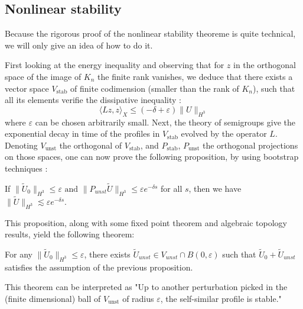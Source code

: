 \documentclass[11pt,a4paper]{article}
\begin{document}
\subsection{Nonlinear stability}
Because the rigorous proof of the nonlinear stability theoreme is quite technical, we will only give an idea of how to do it.

First looking at the energy inequality and observing that for $z$ in the orthogonal space of the image of $K_n$ the finite rank vanishes, we deduce that there exists a vector space $V_{\text{stab}}$ of finite codimension (smaller than the rank of $K_n$), such that all its elements verifie the dissipative inequality : \[\langle  L z, z \rangle_X \leq (-\delta+\varepsilon) \| U \|_{H^3}\]
where $\varepsilon$ can be chosen arbitrarily small.
Next, the theory of semigroups give the exponential decay in time of the profiles in $V_{\text{stab}}$ evolved by the operator $L$.  Denoting $V_{\text{unst}}$ the orthogonal of $V_{\text{stab}}$, and $P_{\text{stab}}$, $P_{\text{unst}}$ the orthogonal projections on those spaces, one can now prove the following proposition, by using bootstrap techniques :
\begin{prop}
If $\|\tilde U_0 \|_{H^3} \leq \varepsilon \text{ and } \|P_{unst}\tilde U \|_{H^3} \leq \varepsilon e^{-\delta s}$ for all $s$, then we have $\|\tilde U \|_{H^3} \lesssim  \varepsilon e^{-\delta s}$.
\end{prop}
This proposition, along with some fixed point theorem and algebraic topology results, yield the following theorem:

\begin{thm}\label{unstab}
For any $\|\tilde U_0 \|_{H^3} \leq \varepsilon$, there exists $\tilde U_{unst} \in V_{unst}\cap B(0,\varepsilon)$ such that $\tilde U_0 + \tilde U_{unst}$ satisfies the assumption of the previous proposition.
\end{thm}

This theorem can be interpreted as "Up to another perturbation picked in the (finite dimensional) ball of $V_{\text{unst}}$ of radius $\varepsilon$, the self-similar profile is stable."
\end{document}
